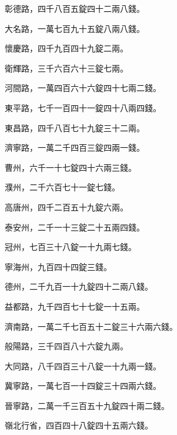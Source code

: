 \begin{pinyinscope}
 彰德路，四千八百五錠四十二兩八錢。



 大名路，一萬七百九十五錠八兩八錢。



 懷慶路，四千九百四十九錠二兩。



 衛輝路，三千六百六十三錠七兩。



 河間路，一萬四百六十六錠四十七兩二錢。



 東平路，七千一百四十一錠四十八兩四錢。



 東昌路，四千八百七十九錠三十二兩。



 濟寧路，一萬二千四百三錠四兩一錢。



 曹州，六千一十七錠四十六兩三錢。



 濮州，二千六百七十一錠七錢。



 高唐州，四千二百五十九錠六兩。



 泰安州，二千一十三錠二十五兩四錢。



 冠州，七百三十八錠一十九兩七錢。



 寧海州，九百四十四錠三錢。



 德州，二千九百一十九錠四十二兩八錢。



 益都路，九千四百七十七錠一十五兩。



 濟南路，一萬二千七百五十二錠三十六兩六錢。



 般陽路，三千四百八十六錠九兩。



 大同路，八千四百三十八錠一十九兩一錢。



 冀寧路，一萬七百一十四錠三十四兩六錢。



 晉寧路，二萬一千三百五十九錠四十兩二錢。



 嶺北行省，四百四十八錠四十五兩六錢。




\end{pinyinscope}
